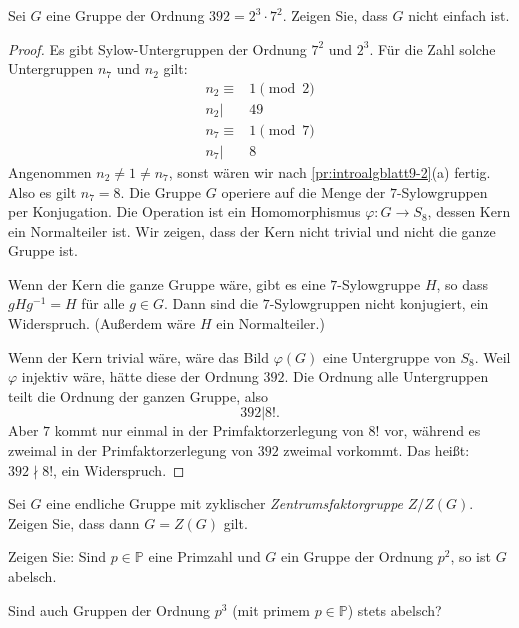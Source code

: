 \begin{Problem}
	Sei $G$ eine Gruppe der Ordnung $392=2^3\cdot 7^2$. Zeigen Sie, dass $G$ nicht einfach ist.
\end{Problem}
\begin{proof}
	Es gibt Sylow-Untergruppen der Ordnung $7^2$ und $2^3$. F\"{u}r die Zahl solche Untergruppen $n_7$ und $n_2$ gilt:
	\begin{align*}
		n_2\equiv& 1\pmod{2}\\
		n_2|&49\\
		n_7\equiv& 1\pmod{7}\\
		n_7|&8
	\end{align*}
	Angenommen $n_2\neq 1\neq n_7$, sonst wären wir nach \ref{pr:introalgblatt9-2}(a) fertig. Also es gilt $n_7=8$. Die Gruppe $G$ operiere auf die Menge der $7$-Sylowgruppen per Konjugation. Die Operation ist ein Homomorphismus $\varphi:G\to S_8$, dessen Kern ein Normalteiler ist. Wir zeigen, dass der Kern nicht trivial und nicht die ganze Gruppe ist.

	Wenn der Kern die ganze Gruppe wäre, gibt es eine $7$-Sylowgruppe $H$, so dass $gHg^{-1}=H$ f\"{u}r alle $g\in G$. Dann sind die $7$-Sylowgruppen nicht konjugiert, ein Widerspruch. (Außerdem wäre $H$ ein Normalteiler.)

Wenn der Kern trivial wäre, wäre das Bild $\varphi(G)$ eine Untergruppe von $S_8$. Weil $\varphi$ injektiv wäre, hätte diese der Ordnung $392$. Die Ordnung alle Untergruppen teilt die Ordnung der ganzen Gruppe, also
\[
392|8!
.\] 
Aber $7$ kommt nur einmal in der Primfaktorzerlegung von $8!$ vor, während es zweimal in der Primfaktorzerlegung von $392$ zweimal vorkommt. Das heißt: $392\nmid 8!$, ein Widerspruch. 
\end{proof}
\begin{Problem}
	\begin{parts}
	\item Sei $G$ eine endliche Gruppe mit zyklischer \emph{Zentrumsfaktorgruppe} $Z / Z(G)$. Zeigen Sie, dass dann $G=Z(G)$ gilt.
	\item Zeigen Sie: Sind $p\in \mathbb{P}$ eine Primzahl und $G$ ein Gruppe der Ordnung $p^2$, so ist $G$ abelsch.
	\item Sind auch Gruppen der Ordnung $p^3$ (mit primem $p\in \mathbb{P}$) stets abelsch?
	\end{parts}
\end{Problem}
